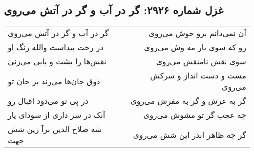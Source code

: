 \begin{center}
\section*{غزل شماره ۲۹۲۶: گر در آب و گر در آتش می‌روی}
\label{sec:2926}
\begin{longtable}{l p{0.5cm} r}
گر در آب و گر در آتش می‌روی
&&
آن نمی‌دانم برو خوش می‌روی
\\
در رخت پیداست والله رنگ او
&&
رو که سوی یار مه وش می‌روی
\\
نقش‌ها را پشت و پایی می‌زنی
&&
سوی نقش نامنقش می‌روی
\\
ذوق جان‌ها می‌زند بر جان تو
&&
مست و دست انداز و سرکش می‌روی
\\
در پی تو می‌دود اقبال رو
&&
گر به عرش و گر به مفرش می‌روی
\\
آنک در سر داری از سودای یار
&&
چه عجب گر تو مشوش می‌روی
\\
شه صلاح الدین برآ زین شش جهت
&&
گر چه ظاهر اندر این شش می‌روی
\\
\end{longtable}
\end{center}
